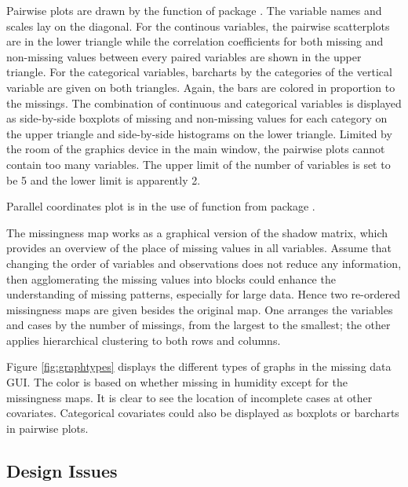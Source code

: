 \documentclass[article]{jss}
\begin{document}
Pairwise plots are drawn by the function  of package  \citep{ggally}. The variable names and scales lay on the diagonal. For the continous variables, the pairwise scatterplots are in the lower triangle while the correlation coefficients for both missing and non-missing values between every paired variables are shown in the upper triangle. For the categorical variables, barcharts by the categories of the vertical variable are given on both triangles. Again, the bars are colored in proportion to the missings. The combination of continuous and categorical variables is displayed as side-by-side boxplots of missing and non-missing values for each category on the upper triangle and side-by-side histograms on the lower triangle. Limited by the room of the graphics device in the main window, the pairwise plots cannot contain too many variables. The upper limit of the number of variables is set to be 5 and the lower limit is apparently 2.

Parallel coordinates plot is in the use of function  from package  \citep{ggplot2}.

The missingness map works as a graphical version of the shadow matrix, which provides an overview of the place of missing values in all variables. Assume that changing the order of variables and observations does not reduce any information, then agglomerating the missing values into blocks could enhance the understanding of missing patterns, especially for large data. Hence two re-ordered missingness maps are given besides the original map. One arranges the variables and cases by the number of missings, from the largest to the smallest; the other applies hierarchical clustering to both rows and columns.

Figure \ref{fig:graphtypes} displays the different types of graphs in the missing data GUI. The color is based on whether missing in humidity except for the missingness maps. It is clear to see the location of incomplete cases at other covariates. Categorical covariates could also be displayed as boxplots or barcharts in pairwise plots. 

\subsection{Design Issues}
\end{document}
